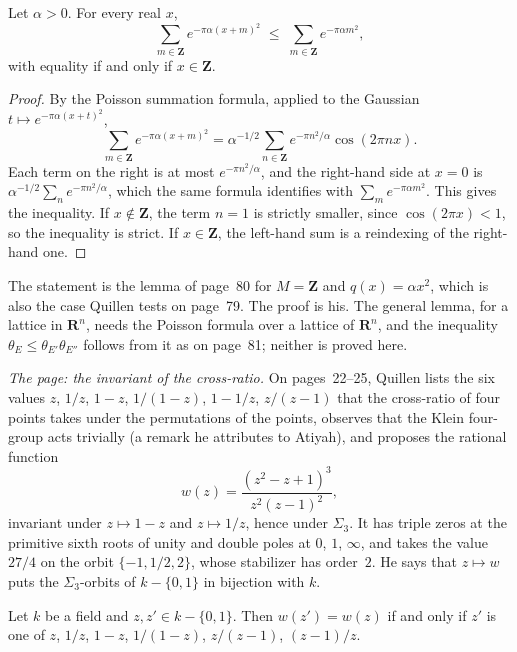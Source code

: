 \begin{encadre}
\begin{theoreme}\label{thm:quillen-1973-3}
Let $\alpha > 0$. For every real $x$,
\[
\sum_{m \in \mathbf Z} e^{-\pi\alpha(x+m)^2} \;\le\; \sum_{m \in \mathbf Z} e^{-\pi\alpha m^2},
\]
with equality if and only if $x \in \mathbf Z$.
\end{theoreme}
\end{encadre}

\begin{proof}
By the Poisson summation formula, applied to the Gaussian $t \mapsto e^{-\pi\alpha(x+t)^2}$,
\[
\sum_{m \in \mathbf Z} e^{-\pi\alpha(x+m)^2} = \alpha^{-1/2} \sum_{n \in \mathbf Z} e^{-\pi n^2/\alpha} \cos(2\pi n x).
\]
Each term on the right is at most $e^{-\pi n^2/\alpha}$, and the right-hand side at $x = 0$ is $\alpha^{-1/2} \sum_n e^{-\pi n^2/\alpha}$, which the same formula identifies with $\sum_m e^{-\pi\alpha m^2}$. This gives the inequality. If $x \notin \mathbf Z$, the term $n = 1$ is strictly smaller, since $\cos(2\pi x) < 1$, so the inequality is strict. If $x \in \mathbf Z$, the left-hand sum is a reindexing of the right-hand one.
\end{proof}

\noindent The statement is the lemma of page~80 for $M = \mathbf Z$ and $q(x) = \alpha x^2$, which is also the case Quillen tests on page~79. The proof is his. The general lemma, for a lattice in $\mathbf R^n$, needs the Poisson formula over a lattice of $\mathbf R^n$, and the inequality $\theta_E \le \theta_{E'}\theta_{E''}$ follows from it as on page~81; neither is proved here.

\emph{The page: the invariant of the cross-ratio.} On pages~22--25, Quillen lists the six values $z$, $1/z$, $1 - z$, $1/(1-z)$, $1 - 1/z$, $z/(z-1)$ that the cross-ratio of four points takes under the permutations of the points, observes that the Klein four-group acts trivially (a remark he attributes to Atiyah), and proposes the rational function
\[
w(z) = \frac{(z^2 - z + 1)^3}{z^2 (z - 1)^2},
\]
invariant under $z \mapsto 1 - z$ and $z \mapsto 1/z$, hence under $\Sigma_3$. It has triple zeros at the primitive sixth roots of unity and double poles at $0$, $1$, $\infty$, and takes the value $27/4$ on the orbit $\{-1, 1/2, 2\}$, whose stabilizer has order~$2$. He says that $z \mapsto w$ puts the $\Sigma_3$-orbits of $k - \{0, 1\}$ in bijection with $k$.

\begin{proposition}\label{prop:quillen-1973-3}
Let $k$ be a field and $z, z' \in k - \{0, 1\}$. Then $w(z') = w(z)$ if and only if $z'$ is one of $z$, $1/z$, $1 - z$, $1/(1-z)$, $z/(z-1)$, $(z-1)/z$.
\end{proposition}

